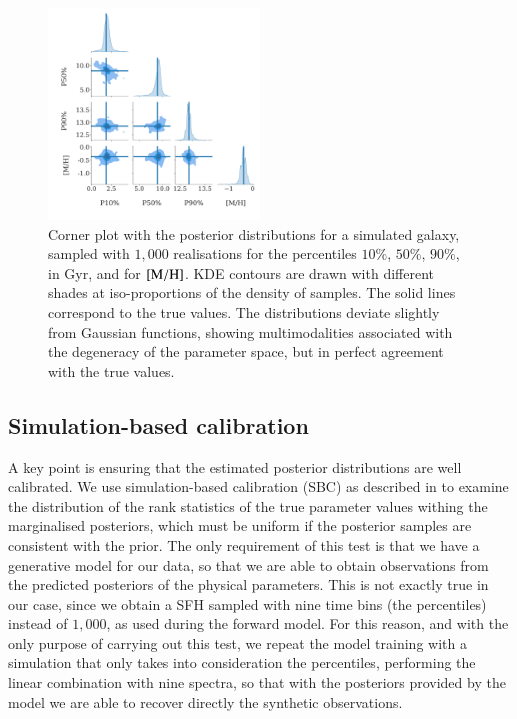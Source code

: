 \begin{figure}[h!]
    \centering
    
    \includegraphics[width=0.5\textwidth]{images/posterior/conerplot0_ok.pdf}

    \caption{Corner plot with the posterior distributions for a simulated galaxy, sampled with $1{,}000$ realisations for the percentiles $10\%$, $50\%$, $90\%$, in Gyr, and for $\rm{[M/H]}$. KDE contours are drawn with different shades at iso-proportions of the density of samples. The solid lines correspond to the true values.  The distributions deviate slightly from Gaussian functions, showing  multimodalities associated with the degeneracy of the parameter space, but in perfect agreement with the true values. }
    \label{corner}
\end{figure}

\subsection{Simulation-based calibration}
\label{sbc}
A key point is ensuring that the estimated posterior distributions are well calibrated. We use simulation-based calibration (SBC) as described in  \cite{talts2020validating} to examine the distribution of the rank statistics of the true parameter values withing the marginalised posteriors, which must be uniform if the posterior samples are consistent with the prior. The only requirement of this test is that we have a generative model for our data, so that we are able to obtain observations from the predicted posteriors of the physical parameters. This is not exactly true in our case, since we obtain a SFH sampled with nine time bins (the percentiles) instead of $1{,}000$, as used during the forward model. For this reason, and with the only purpose of carrying out this test, we repeat the model training  with a simulation that only takes into consideration the percentiles, performing the linear combination with nine spectra, so that with the posteriors provided by the model we are able to recover directly the synthetic observations.\\

